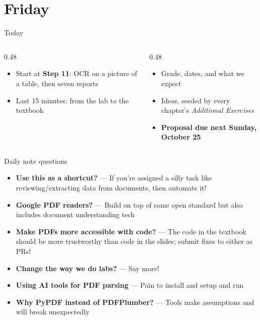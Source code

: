 \documentclass[9pt,aspectratio=169]{beamer}
\begin{document}
\section{Friday}

\begin{frame}{Today}
    \begin{columns}[T]
        \begin{column}{0.48\textwidth}
            \begin{itemize}\small
                \item Start at \textbf{Step 11}: OCR on a picture of a table, then seven reports
                \item Last 15 minutes: from the lab to the textbook
            \end{itemize}
        \end{column}
        \begin{column}{0.48\textwidth}
            \begin{itemize}\small
                \item Grade, dates, and what we expect
                \item Ideas, seeded by every chapter's \textit{Additional Exercises}
                \item \textbf{Proposal due next Sunday, October 25}
            \end{itemize}
        \end{column}
    \end{columns}
\end{frame}

\begin{frame}{Daily note questions}
    \begin{itemize}
        \item \textbf{Use this as a shortcut?} --- If you're assigned a silly task like reviewing/extracting data from documents, then automate it!
        \item \textbf{Google PDF readers?} --- Build on top of same open standard but also includes document understanding tech
        \item \textbf{Make PDFs more accessible with code?} --- The code in the textbook should be more trustworthy than code in the slides; submit fixes to either as PRs!
        \item \textbf{Change the way we do labs?} --- Say more!
        \item \textbf{Using AI tools for PDF parsing} --- Pain to install and setup and run
        \item \textbf{Why PyPDF instead of PDFPlumber?} --- Tools make assumptions and will break unexpectedly
    \end{itemize}
\end{frame}
\end{document}
